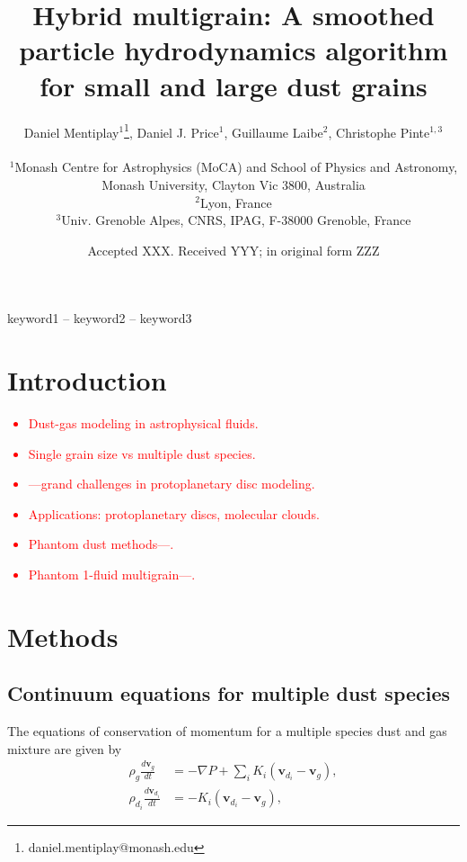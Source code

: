 \documentclass[fleqn,usenatbib]{mnras}
\title[Hybrid multigrain]{Hybrid multigrain: A smoothed particle hydrodynamics
algorithm for small and large dust grains}
\author[Mentiplay, Price, Laibe, \& Pinte]{%
   \parbox{\textwidth}{%
      Daniel Mentiplay$^{1}$\thanks{daniel.mentiplay@monash.edu},
      Daniel J. Price$^{1}$,
      Guillaume Laibe$^{2}$,
      Christophe Pinte$^{1,3}$}\\
   $^{1}$Monash Centre for Astrophysics (MoCA) and School of Physics and
   Astronomy, Monash University, Clayton Vic 3800, Australia \\
   $^{2}$Lyon, France \\
   $^{3}$Univ. Grenoble Alpes, CNRS, IPAG, F-38000 Grenoble, France}
\date{Accepted XXX. Received YYY; in original form ZZZ}
\let\vec\mathbf
\begin{document}
\label{firstpage}
\pagerange{\pageref{firstpage}--\pageref{lastpage}}
\maketitle

\begin{abstract}
\end{abstract}

\begin{keywords}
keyword1 -- keyword2 -- keyword3
\end{keywords}



\section{Introduction}

\textcolor{red}{
\begin{itemize}
   \item Dust-gas modeling in astrophysical fluids.
   \item Single grain size vs multiple dust species.
   \item \citet{Haworth:2016}---grand challenges in protoplanetary disc
      modeling.
   \item Applications: protoplanetary discs, molecular clouds.
   \item Phantom dust methods---\citet{Price:2018}.
   \item Phantom 1-fluid multigrain---\citet{Hutchison:2018}.
\end{itemize}
}

\section{Methods}

\subsection{Continuum equations for multiple dust species}

The equations of conservation of momentum for a multiple species dust and gas
mixture are given by
%
\begin{align}
   \rho_g \frac{d \vec{v}_g}{dt} &= - \nabla P + \sum_i K_i \left(\vec{v}_{d_i}
                                    - \vec{v}_{g}\right), \\
   \rho_{d_i} \frac{d \vec{v}_{d_i}}{dt} &= - K_i \left(\vec{v}_{d_i}
                                                       - \vec{v}_{g}\right),
\end{align}
%
\end{document}
